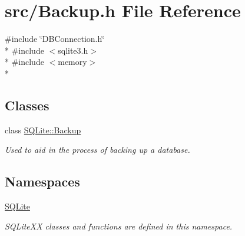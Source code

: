 \hypertarget{a00018}{\section{src/\-Backup.h File Reference}
\label{a00018}
}
{\ttfamily \#include \char`\"{}D\-B\-Connection.\-h\char`\"{}}\\*
{\ttfamily \#include $<$sqlite3.\-h$>$}\\*
{\ttfamily \#include $<$memory$>$}\\*
\subsection*{Classes}
\begin{DoxyCompactItemize}
\item 
class \hyperlink{a00001}{S\-Q\-Lite\-::\-Backup}
\begin{DoxyCompactList}\small\item\em Used to aid in the process of backing up a database. \end{DoxyCompactList}\end{DoxyCompactItemize}
\subsection*{Namespaces}
\begin{DoxyCompactItemize}
\item 
\hyperlink{a00038}{S\-Q\-Lite}
\begin{DoxyCompactList}\small\item\em S\-Q\-Lite\-X\-X classes and functions are defined in this namespace. \end{DoxyCompactList}\end{DoxyCompactItemize}
